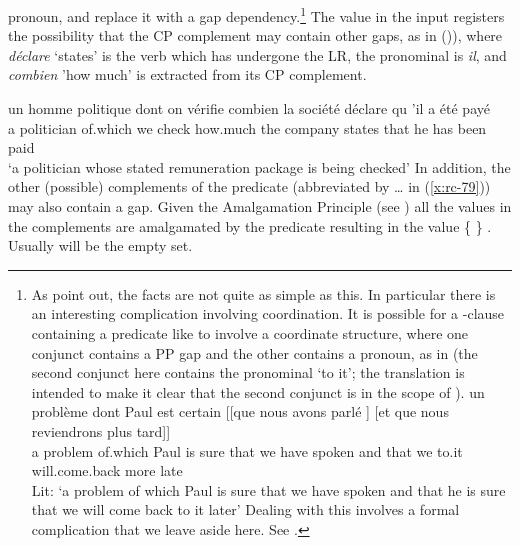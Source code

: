 \documentclass[output=paper
 	        ,biblatex
                ,babelshorthands
                ,newtxmath
                ,draftmode
                ,colorlinks, citecolor=brown
]{langscibook}
\begin{document}
pronoun, and replace it with a gap dependency.\footnote{As \citet{AbeilleGodard07} point
  out, the facts are not quite as simple as this. In particular there is an interesting
  complication involving coordination. It is possible for a -clause containing a
  predicate like  to involve a coordinate structure, where one conjunct
  contains a PP gap and the other contains a pronoun, as in  (the
  second conjunct here contains the pronominal  `to it'; the  translation is
  intended to make it clear that the second conjunct is in the scope of ).
  \ea\label{x:rc-80}
  \gll
    un problème dont     Paul est certain [[que nous avons parlé  \trace] [et que nous  reviendrons plus tard]]\\
    a  problem  of.which Paul is  sure    \hphantom{[[}that we have   spoken {} \hphantom{[}and that we to.it will.come.back more late\\
  \glt Lit: `a problem of which Paul is sure that we have  spoken and that he is sure that we will come back to it later'
  \z
  Dealing with this
  involves a formal complication that we leave aside here. See .}
The \SLASH value  in the input registers the possibility that the CP complement may contain other 
gaps, as in ()), where \emph{déclare} `states' is the verb which has undergone the LR, the pronominal is \emph{il},
and \emph{combien} 'how much' is extracted from its CP complement.  

\ea
\gll un {homme politique} dont     on vérifie combien  la société   déclare qu  'il   a   été  payé\\
     a  politician        of.which we check   how.much the company  states  that he   has been
     paid\\
%
\glt `a politician whose stated remuneration package is being checked'
\z
%
In addition, the other (possible) complements of the predicate (abbreviated by \ldots{} in (\ref{x:rc-79})) may also
contain a gap. Given the \SLASH Amalgamation Principle (see \crossrefchapteralt[\pageref{udc:slash-amalgamation-principle}]{udc})  all the \SLASH values 
in the complements are amalgamated by the predicate resulting in the \SLASH value \{  \} \cupAVM
{}.  Usually  will be the empty set.
%
%
%
\end{document}
